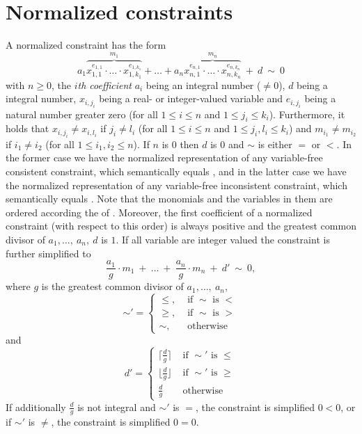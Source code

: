 \section{Normalized constraints}
A normalized constraint has the form
\[a_1\overbrace{x_{1,1}^{e_{1,1}}\cdot\ldots\cdot x_{1,k_1}^{e_{1,k_1}}}^{m_1}+\ldots+a_n\overbrace{x_{n,1}^{e_{n,1}}\cdot\ldots\cdot x_{n,k_n}^{e_{n,k_n}}}^{m_n}\ + \ d\ \sim \ 0\]
with $n\geq0$, the \emph{$i$th coefficient} $a_i$ being an integral number ($\neq 0$), $d$ being a integral number, $x_{i,j_i}$ being a real- or integer-valued variable and $e_{i,j_i}$ being a natural number greater zero (for all $1\leq i\leq n$ and $1\leq j_i\leq k_i$). Furthermore, it holds that
$x_{i,j_i}\neq x_{i,l_i}$ if $j_i\neq l_i$ (for all $1\leq i\leq n$ and $1\leq j_i, l_i\leq k_i$) and $m_{i_1}\neq m_{i_2}$ if $i_1\neq i_2$ (for all $1\leq i_1,i_2\leq n$). If $n$ is $0$ then $d$ is $0$ and $\sim$ is either $=$ or $<$. In the former case we have the normalized representation of any variable-free consistent constraint, which semantically equals \true, and in the latter case we have the normalized representation of any variable-free inconsistent constraint, which semantically equals \false. Note that the monomials and the variables in them are ordered according the \polynomialOrder of \carl.
Moreover, the first coefficient of a normalized constraint (with respect to this order) is always positive and the greatest common divisor of $a_1,\ldots,\ a_n,\ d$ is $1$. If all variable are integer valued the constraint is further simplified to
\[\frac{a_1}{g}\cdot m_1\ +\ \ldots\ +\ \frac{a_n}{g}\cdot m_n\ + \ d'\  \sim \ 0,\]
where $g$ is the greatest common divisor of $a_1,\ldots,\ a_n$, 
\[\sim'=\left\{
\begin{array}{ll}
\leq, &\text{ if }\sim\text{ is }< \\
\geq, &\text{ if }\sim\text{ is }> \\
\sim, &\text{ otherwise }
\end{array}
\right.\]
and
\[
d' = \left\{
\begin{array}{ll}
\lceil\frac{d}{g}\rceil &\text{ if }\sim'\text{ is }\leq \\[1.5ex]
\lfloor\frac{d}{g}\rfloor &\text{ if }\sim'\text{ is }\geq \\[1.5ex]
\frac{d}{g} &\text{ otherwise }
\end{array}
\right.\]
If additionally $\frac{d}{g}$ is not integral and $\sim'$ is $=$, the constraint is simplified $0<0$, or if $\sim'$ is $\neq$,
the constraint is simplified $0=0$.

